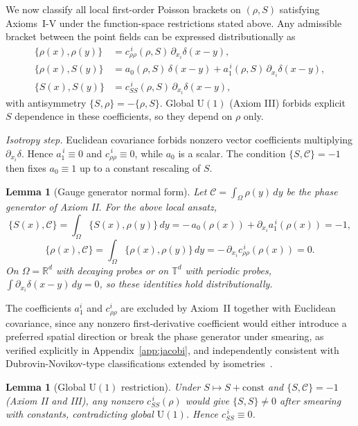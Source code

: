 \documentclass[11pt,a4paper]{article}
\numberwithin{equation}{section}
\theoremstyle{thmcompact}
\newtheorem{lemma}[theorem]{Lemma}
\theoremstyle{remark}
\begin{document}
	We now classify all local first-order Poisson brackets on $(\rho,S)$ satisfying Axioms~I-V under the function-space restrictions stated above.
Any admissible bracket between the point fields can be expressed distributionally as
\smallskip
\begin{align}
	\{\rho(x),\rho(y)\}&=c_{\rho\rho}^{\,i}(\rho,S)\,\partial_{x_i}\delta(x-y),\\
	\{\rho(x),S(y)\}&=a_{0}(\rho,S)\,\delta(x-y)+a_{1}^{\,i}(\rho,S)\,\partial_{x_i}\delta(x-y),\\
	\{S(x),S(y)\}&=c_{SS}^{\,i}(\rho,S)\,\partial_{x_i}\delta(x-y),
\end{align}
with antisymmetry $\{S,\rho\}=-\{\rho,S\}$. Global $\mathrm{U}(1)
$ (Axiom III) forbids explicit $S$ dependence in these coefficients, so they depend on $\rho$ only.

\textit{Isotropy step.} Euclidean covariance forbids nonzero vector coefficients multiplying $\partial_{x_i}\delta$. Hence $a_{1}^{\,i}\equiv 0$ and $c_{\rho\rho}^{\,i}\equiv 0$, while $a_{0}$ is a scalar. The condition $\{S,\mathcal C\}=-1$ then fixes $a_{0}\equiv 1$ up to a constant rescaling of $S$.

	
\begin{lemma}[Gauge generator normal form]
	Let $\mathcal C=\!\int_{\Omega}\rho(y)\,dy$ be the phase generator of Axiom II. For the above local ansatz,
	\[
	\{S(x),\mathcal C\}=\int_{\Omega}\{S(x),\rho(y)\}\,dy
	=-\,a_{0}(\rho(x))+\partial_{x_i}a_{1}^{\,i}(\rho(x))=-1,
	\]
	\[
	\{\rho(x),\mathcal C\}=\int_{\Omega}\{\rho(x),\rho(y)\}\,dy
	=-\,\partial_{x_i}c_{\rho\rho}^{\,i}(\rho(x))=0.
	\]
	On $\Omega=\mathbb R^{d}$ with decaying probes or on $\mathbb T^{d}$ with periodic probes, $\int \partial_{x_i}\delta(x-y)\,dy=0$, so these identities hold distributionally.
\end{lemma}

\smallskip
The coefficients \(a_{1}^i\) and \(c_{\rho\rho}^i\) are excluded by Axiom~II together with Euclidean covariance, since any nonzero first-derivative coefficient would either introduce a preferred spatial direction or break the phase generator under smearing, as verified explicitly in Appendix~\ref{app:jacobi}, and independently consistent with Dubrovin-Novikov-type classifications extended by isometries~\cite{pavlov2021}.
\smallskip
\begin{lemma}[Global $\mathrm{U}(1)
$ restriction]
	Under $S\mapsto S+\mathrm{const}$ and $\{S,\mathcal C\}=-1$ (Axiom II and III), any nonzero $c_{SS}^{\,i}(\rho)$ would give $\{S,S\}\neq 0$ after smearing with constants, contradicting global $\mathrm{U}(1)
$. Hence $c_{SS}^{\,i}\equiv 0$.
\end{lemma}
\end{document}
